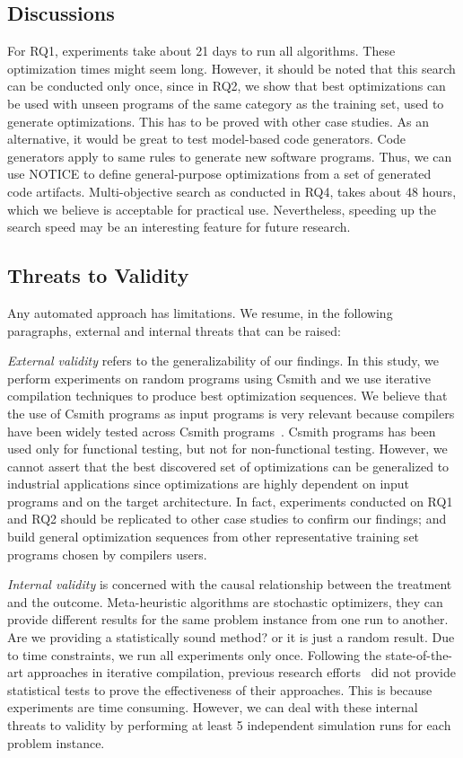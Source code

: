 \subsection{Discussions}
For RQ1, experiments take about 21 days to run all algorithms. These optimization times might seem long. However, it should be noted that this search can be conducted only once, since in RQ2, we show that best optimizations can be used with unseen programs of the same category as the training set, used to generate optimizations. This has to be proved with other case studies. As an alternative, it would be great to test model-based code generators. Code generators apply to same rules to generate new software programs. Thus, we can use NOTICE to define general-purpose optimizations from a set of generated code artifacts. 
Multi-objective search as conducted in RQ4, takes about 48 hours, which we believe is acceptable for practical use. Nevertheless, speeding up the search speed
may be an interesting feature for future research.



\subsection{Threats to Validity}
Any automated approach has limitations. We resume, in the following paragraphs, external and internal threats that can be raised:
 
\textit{External validity} refers to the generalizability of our findings. In this study, we perform experiments on random programs using Csmith and we use iterative compilation techniques to produce best optimization sequences. We believe that the use of Csmith programs as input programs is very relevant because compilers have been widely tested across Csmith programs~\cite{chen2016empirical,yang2011finding}. Csmith programs has been used only for functional testing, but not for non-functional testing. However, we cannot assert that the best discovered set of optimizations can be generalized to industrial applications since optimizations are highly dependent on input programs and on the target architecture. In fact, experiments conducted on RQ1 and RQ2 should be replicated to other case studies to confirm our findings; and build general optimization sequences from other representative training set programs chosen by compilers users.

\textit{Internal validity} is concerned with the causal relationship between the treatment and the outcome. Meta-heuristic algorithms are stochastic optimizers, they can provide different results for the same problem instance from one run to another. Are we providing a statistically sound method? or it is just a random result. Due to time constraints, we run all experiments only once. Following the state-of-the-art approaches in iterative compilation, previous research efforts~\cite{hoste2008cole,martinez2014multi} did not provide statistical tests to prove the effectiveness of their approaches. This is because experiments are time consuming. However, we can deal with these internal threats to validity by performing at least 5 independent simulation runs for each problem instance.  
 
